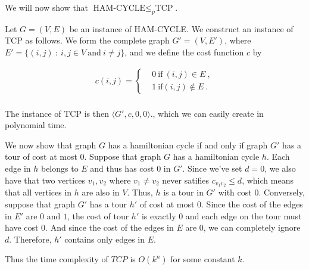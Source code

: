 We will now show that $\text{HAM-CYCLE} \leq_p \text{TCP}$.

Let $G = (V,E)$ be an instance of HAM-CYCLE. We construct an instance
of TCP as follows. We form the complete graph $G' = (V,E')$, where $E'
= \{(i,j)~:~i,j\in V ~ \text{and}~ i \neq j \}$, and we define the
cost function $c$ by

\begin{align*}
  c(i,j) = \begin{cases} & 0 ~ \text{if} ~ (i, j) \in E~ , \\
    & 1 ~ \text{if} (i, j) \notin E~.\end{cases}\\
\end{align*}

The instance of TCP is then $\langle G', c, 0, 0 \rangle$., which we
can easily create in polynomial time.

We now show that graph $G$ has a hamiltonian cycle if and only if
graph $G'$ has a tour of cost at most $0$. Suppose that graph $G$ has
a hamiltonian cycle $h$. Each edge in $h$ belongs to $E$ and thus has
cost $0$ in $G'$. Since we've set $d=0$, we also have that two
vertices $v_1, v_2$ where $v_1 \neq v_2$ never satifies $c_{v_1v_2} \leq d$,
which means that all vertices in $h$ are also in $V$. Thus, $h$ is a
tour in $G'$ with cost $0$. Conversely, suppose that graph $G'$ has a
tour $h'$ of cost at most $0$. Since the cost of the edges in $E'$ are
$0$ and $1$, the cost of tour $h'$ is exactly $0$ and each edge on the
tour must have cost 0. And since the cost of the edges in $E$ are $0$,
we can completely ignore $d$. Therefore, $h'$ contains only edges in
$E$.

Thus the time complexity of $TCP$ is $O(k^n)$ for some constant $k$.
